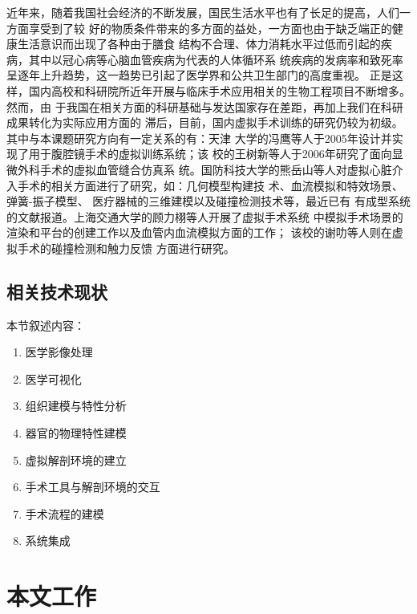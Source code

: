 近年来，随着我国社会经济的不断发展，国民生活水平也有了长足的提高，人们一方面享受到了较
好的物质条件带来的多方面的益处，一方面也由于缺乏端正的健康生活意识而出现了各种由于膳食
结构不合理、体力消耗水平过低而引起的疾病，其中以冠心病等心脑血管疾病为代表的人体循环系
统疾病的发病率和致死率呈逐年上升趋势，这一趋势已引起了医学界和公共卫生部门的高度重视。
正是这样，国内高校和科研院所近年开展与临床手术应用相关的生物工程项目不断增多。然而，由
于我国在相关方面的科研基础与发达国家存在差距，再加上我们在科研成果转化为实际应用方面的
滞后，目前，国内虚拟手术训练的研究仍较为初级。其中与本课题研究方向有一定关系的有：天津
大学的冯鹰\cite{li2005master}等人于2005年设计并实现了用于腹腔镜手术的虚拟训练系统；该
校的王树新等人\cite{zeng2006master}于2006年研究了面向显微外科手术的虚拟血管缝合仿真系
统。国防科技大学的熊岳山等人对虚拟心脏介入手术的相关方面进行了研究，如：几何模型构建技
术\cite{han2005master}、血流模拟和特效场景\cite{ren2005master}、弹簧-振子模型\cite{wang2006master}、
医疗器械的三维建模\cite{zhu2007master}以及碰撞检测技术\cite{kang2007master}等，最近已有
有成型系统的文献报道\cite{tan2012coronary}。上海交通大学的顾力栩等人开展了虚拟手术系统
中模拟手术场景的渲染和平台的创建工作\cite{zheng2008master}以及血管内血流模拟方面的工作\cite{huang2011virtual}；
该校的谢叻等人则在虚拟手术的碰撞检测\cite{wu2010virtual}和触力反馈\cite{wu2011virtual}
方面进行研究。

\subsection{相关技术现状}

本节叙述内容：
\begin{enumerate}
  \item 医学影像处理
  \item 医学可视化
  \item 组织建模与特性分析
  \item 器官的物理特性建模
  \item 虚拟解剖环境的建立
  \item 手术工具与解剖环境的交互
  \item 手术流程的建模
  \item 系统集成
\end{enumerate}

\section{本文工作}


